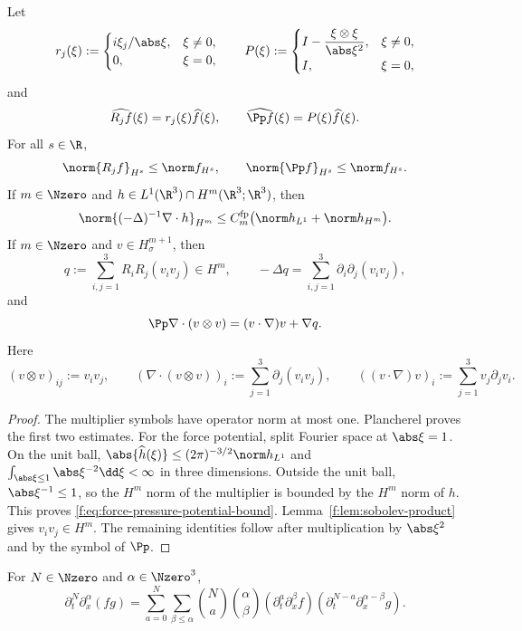 \begin{lemma}
\label{f:lem:riesz-leray}
Let
\[
 r_j(\xi):=
 \begin{cases}
 i\xi_j/\abs\xi,&\xi\ne0,\\
 0,&\xi=0,
 \end{cases}
 \qquad
 P(\xi):=
 \begin{cases}
 I-\dfrac{\xi\otimes\xi}{\abs\xi^2},&\xi\ne0,\\
 I,&\xi=0,
 \end{cases}
\]
and
\[
 \widehat{R_jf}(\xi)=r_j(\xi)\widehat f(\xi),
 \qquad
 \widehat{\Pp f}(\xi)=P(\xi)\widehat f(\xi).
\]
For all \(s\in\R\),
\[
 \norm{R_jf}_{H^s}\le\norm f_{H^s},
 \qquad
 \norm{\Pp f}_{H^s}\le\norm f_{H^s}.
\]
If \(m\in\Nzero\) and \(h\in L^1(\R^3)\cap H^m(\R^3;\R^3)\), then
\begin{equation}
 \norm{(-\Delta)^{-1}\nabla\cdot h}_{H^m}
 \le C_m^{\rm fp}\bigl(\norm h_{L^1}+\norm h_{H^m}\bigr).
 \label{f:eq:force-pressure-potential-bound}
\end{equation}
If \(m\in\Nzero\) and \(v\in H^{m+1}_\sigma\), then
\[
 q:=\sum_{i,j=1}^3R_iR_j(v_iv_j)\in H^m,
 \qquad
 -\Delta q=\sum_{i,j=1}^3\partial_i\partial_j(v_iv_j),
\]
and
\[
 \Pp\nabla\cdot(v\otimes v)
 =(v\cdot\nabla)v+\nabla q.
\]
Here
\[
 (v\otimes v)_{ij}:=v_iv_j,
 \qquad
 (\nabla\cdot(v\otimes v))_i
 :=\sum_{j=1}^3\partial_j(v_iv_j),
 \qquad
 ((v\cdot\nabla)v)_i:=\sum_{j=1}^3v_j\partial_jv_i.
\]
\end{lemma}

\begin{proof}
The multiplier symbols have operator norm at most one.  Plancherel proves the
first two estimates.  For the force potential, split Fourier space at
\(\abs\xi=1\).  On the unit ball,
\(\abs{\widehat h(\xi)}\le(2\pi)^{-3/2}\norm h_{L^1}\) and
\(\int_{\abs\xi\le1}\abs\xi^{-2}\dd\xi<\infty\) in three dimensions.
Outside the unit ball, \(\abs\xi^{-1}\le1\), so the \(H^m\) norm of the
multiplier is bounded by the \(H^m\) norm of \(h\).  This proves
\eqref{f:eq:force-pressure-potential-bound}.  Lemma~\ref{f:lem:sobolev-product} gives
\(v_iv_j\in H^m\).  The remaining identities follow after multiplication by
\(\abs\xi^2\) and by the symbol of \(\Pp\).
\end{proof}

\begin{lemma}
\label{f:lem:mixed-leibniz}
For \(N\in\Nzero\) and \(\alpha\in\Nzero^3\),
\[
 \partial_t^N\partial_x^\alpha(fg)
 =\sum_{a=0}^N\sum_{\beta\le\alpha}
 \binom Na\binom\alpha\beta
 (\partial_t^a\partial_x^\beta f)
 (\partial_t^{N-a}\partial_x^{\alpha-\beta}g).
\]
\end{lemma}

